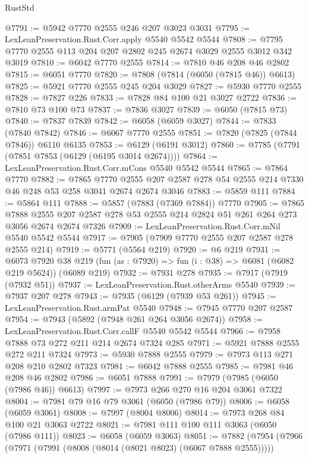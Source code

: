 \begin{lexlean}{RustStd}
\begin{coremodule}
@7791 := @5942 @7770 @2555 @246 @207 @3023 @3031
@7795 := LexLeanPreservation.Rust.Corr.apply @5540 @5542 @5544
@7808 := @7795 @7770 @2555 @113 @204 @207 @2802 @245 @2674 @3029 @2555 @3012 @342 @3019
@7810 := @6042 @7770 @2555
@7814 := @7810 @46 @208 @46 @2802
@7815 := @6051 @7770
@7820 := @7808 (@7814 (@6050 (@7815 @46)) @6613)
@7825 := @5921 @7770 @2555 @245 @204 @3029
@7827 := @5930 @7770 @2555
@7828 := @7827 @226
@7833 := @7828 @84 @100 @21 @3027 @2722
@7836 := @7810 @73 @100 @73
@7837 := @7836 @3027
@7839 := @6050 (@7815 @73)
@7840 := @7837 @7839
@7842 := @6058 (@6059 @3027)
@7844 := @7833 (@7840 @7842)
@7846 := @6067 @7770 @2555
@7851 := @7820 (@7825 (@7844 @7846)) @6110 @6135
@7853 := @6129 (@6191 @3012)
@7860 := @7785 (@7791 (@7851 @7853 (@6129 (@6195 @3014 @2674))))
@7864 := LexLeanPreservation.Rust.Corr.mCons @5540 @5542 @5544
@7865 := @7864 @7770
@7882 := @7865
    @7770
    @2555
    @207
    @2587
    @278
    @54
    @2555
    @214
    @7330
    @46
    @248
    @53
    @258
    @3041
    @2674
    @2674
    @3046
@7883 := @5859 @111
@7884 := @5864 @111
@7888 := @5857 (@7883 (@7369 @7884)) @7770
@7905 := @7865
    @7888
    @2555
    @207
    @2587
    @278
    @53
    @2555
    @214
    @2824
    @51
    @261
    @264
    @273
    @3056
    @2674
    @2674
    @7326
@7909 := LexLeanPreservation.Rust.Corr.mNil @5540 @5542 @5544
@7917 := @7905 (@7909 @7770 @2555 @207 @2587 @278 @2555 @214)
@7919 := @5771 (@5564 @219)
@7920 := @6 @219
@7931 := @6073
    @7920
    @38
    @219
    (fun (as : @7920) => fun (i : @38) => @6081 (@6082 @219 @5624))
    (@6089 @219)
@7932 := @7931 @278
@7935 := @7917 (@7919 (@7932 @51))
@7937 := LexLeanPreservation.Rust.otherArms @5540
@7939 := @7937 @207 @278
@7943 := @7935 (@6129 (@7939 @53 @261))
@7945 := LexLeanPreservation.Rust.armPat @5540
@7948 := @7945 @7770 @207 @2587
@7954 := @7943 (@5892 (@7948 @261 @264 @3056 @2674))
@7958 := LexLeanPreservation.Rust.Corr.callF @5540 @5542 @5544
@7966 := @7958 @7888 @73 @272 @211 @214 @2674 @7324 @285
@7971 := @5921 @7888 @2555 @272 @211 @7324
@7973 := @5930 @7888 @2555
@7979 := @7973 @113 @271 @208 @210 @2802 @7323
@7981 := @6042 @7888 @2555
@7985 := @7981 @46 @208 @46 @2802
@7986 := @6051 @7888
@7991 := @7979 (@7985 (@6050 (@7986 @46)) @6613)
@7997 := @7973 @266 @270 @16 @204 @3061 @7322
@8004 := @7981 @79 @16 @79 @3061 (@6050 (@7986 @79))
@8006 := @6058 (@6059 @3061)
@8008 := @7997 (@8004 @8006)
@8014 := @7973 @268 @84 @100 @21 @3063 @2722
@8021 := @7981 @111 @100 @111 @3063 (@6050 (@7986 @111))
@8023 := @6058 (@6059 @3063)
@8051 := @7882
    (@7954
      (@7966
        (@7971 (@7991 (@8008 (@8014 (@8021 @8023) (@6067 @7888 @2555)))))

\end{coremodule}
\end{lexlean}
